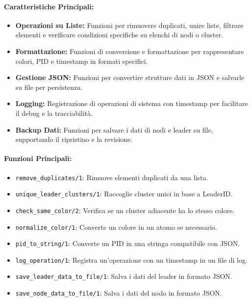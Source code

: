 \documentclass[12pt, a4paper]{report}
\begin{document}
\paragraph{Caratteristiche Principali:}
\begin{itemize}
    \item \textbf{Operazioni su Liste:} Funzioni per rimuovere duplicati, unire liste, filtrare elementi e verificare condizioni specifiche su elenchi di nodi o cluster.
    \item \textbf{Formattazione:} Funzioni di conversione e formattazione per rappresentare colori, PID e timestamp in formati specifici.
    \item \textbf{Gestione JSON:} Funzioni per convertire strutture dati in JSON e salvarle su file per persistenza.
    \item \textbf{Logging:} Registrazione di operazioni di sistema con timestamp per facilitare il debug e la tracciabilità.
    \item \textbf{Backup Dati:} Funzioni per salvare i dati di nodi e leader su file, supportando il ripristino e la revisione.
\end{itemize}

\paragraph{Funzioni Principali:}
\begin{itemize}
    \item \texttt{remove\_duplicates/1}: Rimuove elementi duplicati da una lista.
    \item \texttt{unique\_leader\_clusters/1}: Raccoglie cluster unici in base a LeaderID.
    \item \texttt{check\_same\_color/2}: Verifica se un cluster adiacente ha lo stesso colore.
    \item \texttt{normalize\_color/1}: Converte un colore in un atomo se necessario.
    \item \texttt{pid\_to\_string/1}: Converte un PID in una stringa compatibile con JSON.
    \item \texttt{log\_operation/1}: Registra un'operazione con un timestamp in un file di log.
    \item \texttt{save\_leader\_data\_to\_file/1}: Salva i dati del leader in formato JSON.
    \item \texttt{save\_node\_data\_to\_file/1}: Salva i dati del nodo in formato JSON.
\end{itemize}
\end{document}
